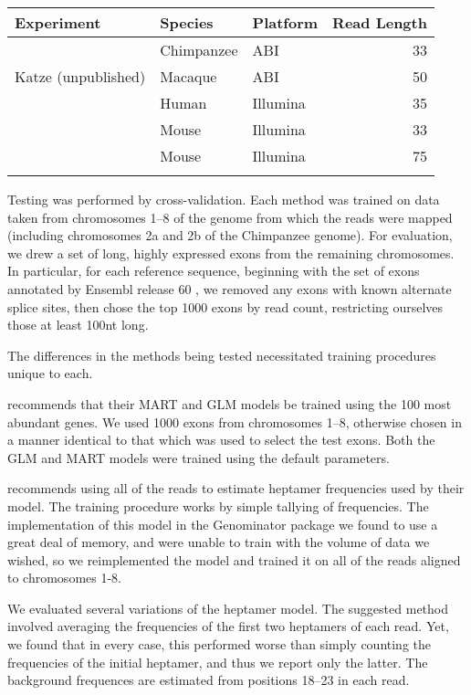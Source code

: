 \documentclass{bioinfo}
\begin{document}
\begin{table}
{
\begin{tabular}{lllr}\toprule
Experiment & Species & Platform & Read Length \\\midrule
\citet{Wetterbom2010} & Chimpanzee & ABI & 33 \\
Katze (unpublished) & Macaque & ABI & 50 \\
\citet{Bullard2010} & Human & Illumina & 35 \\
\citet{Mortazavi2008} & Mouse & Illumina & 33 \\
\citet{Trapnell2010} & Mouse & Illumina & 75 \\\botrule
\end{tabular}
}{}
\end{table}


Testing was performed by cross-validation. Each method was trained on data taken
from chromosomes 1--8 of the genome from which the reads were mapped (including
chromosomes 2a and 2b of the Chimpanzee genome). For evaluation, we drew a set
of long, highly expressed exons from the remaining chromosomes. In particular, for
each reference sequence, beginning with the set of exons annotated by Ensembl
release 60 \cite{Hubbard2009}, we removed any exons with known alternate splice
sites, then chose the top 1000 exons by read count, restricting ourselves those
at least 100nt long.

The differences in the methods being tested necessitated training procedures
unique to each.

\citet{Li2010} recommends that their MART and GLM models be trained using the
100 most abundant genes. We used 1000 exons from chromosomes 1--8, otherwise
chosen in a manner identical to that which was used to select the test exons.
Both the GLM and MART models were trained using the default parameters.

\citet{Hansen2010} recommends using all of the reads to estimate heptamer
frequencies used by their model. The training procedure works by simple tallying
of frequencies. The implementation of this model in the Genominator package we
found to use a great deal of memory, and were unable to train with the volume of
data we wished, so we reimplemented the model and trained it on all of the reads
aligned to chromosomes 1-8.

We evaluated several variations of the heptamer model. The suggested method
involved averaging the frequencies of the first two heptamers of each read. Yet,
we found that in every case, this performed worse than simply counting the
frequencies of the initial heptamer, and thus we report only the latter. The
background frequences are estimated from positions 18--23 in each read.
\end{document}

